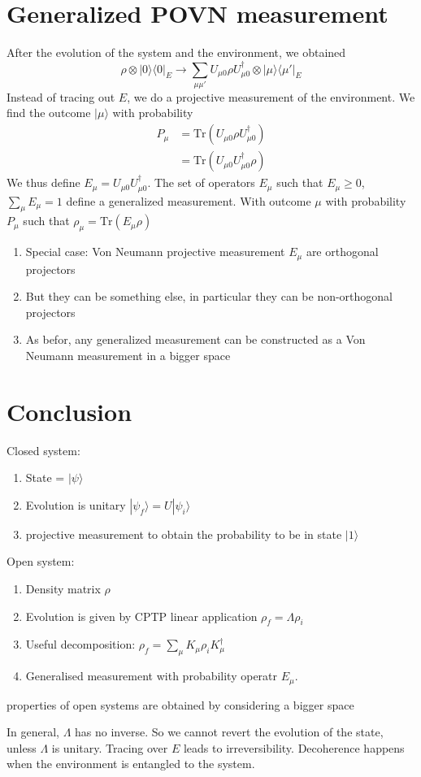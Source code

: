 \documentclass[a4paper]{book}
\theoremstyle{definition}
\theoremstyle{remark}
\begin{document}
\section{Generalized POVN measurement}

After the evolution of the system and the environment, we obtained 
\begin{equation}
    \rho \otimes |0\rangle \langle 0|_E \rightarrow \sum_{\mu\mu'} U_{\mu 0} \rho U^\dagger_{\mu 0} \otimes |\mu \rangle\langle \mu'|_E
\end{equation}
Instead of tracing out $E$, we do a projective measurement of the environment. We find the outcome $|\mu\rangle$ with probability 
\begin{equation}
\begin{aligned}
    P_\mu &= \text{Tr}(U_{\mu 0} \rho U^\dagger_{\mu 0}) \\
    &= \text{Tr}(U_{\mu 0}  U^\dagger_{\mu 0} \rho)    
\end{aligned}
\end{equation}
We thus define $E_\mu = U_{\mu 0}  U^\dagger_{\mu 0}$. The set of operators $E_\mu$ such that $E_\mu \geq 0$, $\sum_\mu E_\mu = 1$ define a generalized measurement. With outcome $\mu$ with probability $P_\mu$ such that $\rho_\mu = \text{Tr}(E_\mu \rho)$ 

\begin{enumerate}
    \item Special case: Von Neumann projective measurement $E_\mu$ are orthogonal projectors 
    \item But they can be something else, in particular they can be non-orthogonal projectors 
    \item As befor, any generalized measurement can be constructed as a Von Neumann measurement in a bigger space 
\end{enumerate}

\section{Conclusion}

Closed system: 
\begin{enumerate}
    \item State = $|\psi\rangle$
    \item Evolution is unitary $|\psi_f\rangle = U|\psi_i\rangle$
    \item projective measurement to obtain the probability to be in state $|1\rangle$
\end{enumerate}
Open system: 
\begin{enumerate}
    \item Density matrix $\rho$
    \item Evolution is given by CPTP linear application $\rho_f = \Lambda \rho_i$
    \item Useful decomposition: $\rho_f = \sum_\mu K_\mu \rho_i K^\dagger _\mu$
    \item Generalised measurement with probability operatr $E_\mu$. 
\end{enumerate}
properties of open systems are obtained by considering a bigger space \par \medskip 

In general, $\Lambda$ has no inverse. So we cannot revert the evolution of the state, unless $\Lambda$ is unitary. Tracing over $E$ leads to irreversibility. Decoherence happens when the environment is entangled to the system. 
\end{document}
